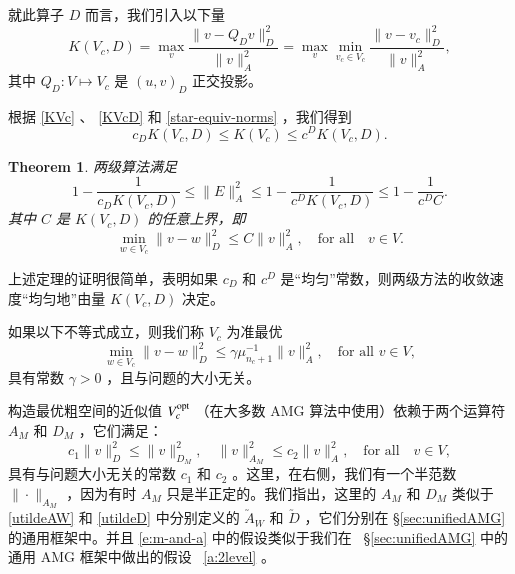 \documentclass[12pt]{acta_2011xz}
\newcommand{\Dscalar}[2]{\ensuremath{( #1 , #2 )_D}}
\newcommand{\Dnorm}[1]{\|#1\|_{D}}
\newcommand{\Dproj}{\ensuremath{Q_D}}
\newtheorem{theorem}{Theorem}[section]
\begin{document}
就此算子    $D$    而言，我们引入以下量
   \begin{equation}
  \label{KVcD} K(V_c,D)= \max_{v}\frac{\Dnorm{v-\Dproj
v}^2}{\|v\|_A^2} =\max_{v}\min_{v_c\in
V_c}\frac{\Dnorm{v-v_c}^2}{\|v\|_A^2},
\end{equation}    其中    $\Dproj: V\mapsto V_c$    是    $\Dscalar{u}{v}$    正交投影。  

根据    \eqref{KVc}    、    \eqref{KVcD}    和    \eqref{star-equiv-norms}    ，我们得到
   \begin{equation}
  \label{KK} c_D K(V_c,D)\le K(V_c)\le c^D K(V_c,D).
\end{equation}     

   \begin{theorem}   \label{thm:two-level-theorem-period}    两级算法满足
   \begin{equation}\label{eq:y-two-level-estimate}
1-\frac{1}{c_DK(V_c,D)}\le \|E\|_A^2 \le 1-\frac{1}{c^DK(V_c,D)} \le
1-\frac{1}{c^DC}.
\end{equation}    其中    $C$    是    $K(V_c,D)$    的任意上界，即
   \begin{equation}\label{eq:approximation-z} 
    \min_{w\in V_c}\Dnorm{v-w}^2 \le C\|v\|_A^2, \quad\mbox{for all}\quad v\in V.
\end{equation}     \end{theorem}    上述定理的证明很简单，表明如果    $c_D$    和    $c^D$    是“均匀”常数，则两级方法的收敛速度“均匀地”由量    $K(V_c,D)$    决定。  

如果以下不等式成立，则我们称    $V_c$    为准最优 
   \begin{equation}\label{quasi-opt}
    \min_{w\in V_c}\Dnorm{v-w}^2 \le \gamma\mu_{n_c+1}^{-1}\|v\|_A^2, \quad\mbox{for all } v\in V,
\end{equation}    具有常数    $\gamma>0$   ，且与问题的大小无关。  

构造最优粗空间的近似值
   $V_c^{\rm opt}$    （在大多数 AMG 算法中使用）依赖于两个运算符    $A_M$    和    $D_M$   ，它们满足：
   \begin{equation}\label{e:m-and-a}
c_1\|v\|_D^2 \le \|v\|_{D_M}^2, \quad 
\|v\|_{A_M}^2\le c_2\|v\|_A^2, \quad\mbox{for all}\quad v\in V , 
\end{equation}    具有与问题大小无关的常数    $c_1$    和    $c_2$   。这里，在右侧，我们有一个半范数    $\|\cdot\|_{A_M}$    ，因为有时    $A_M$    只是半正定的。我们指出，这里的    $A_M$    和    $D_M$    类似于    \eqref{utildeAW}    和    \eqref{utildeD}    中分别定义的    $\utilde A_W$    和    $\utilde D$    ，它们分别在    \S       \ref{sec:unifiedAMG}    的通用框架中。并且
   \eqref{e:m-and-a}    中的假设类似于我们在~    \S       \ref{sec:unifiedAMG}    中的通用 AMG 框架中做出的假设~    \ref{a:2level}    。  
\end{document}
